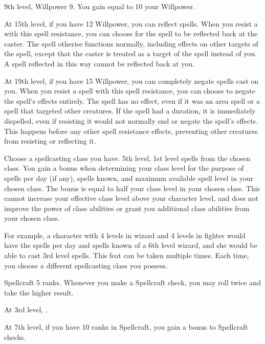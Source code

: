     \featpres 9th level, Willpower 9.
    \featben You gain  equal to 10 \add your Willpower.

    At 15th level, if you have 12 Willpower, you can reflect spells.
    When you resist a  with this spell resistance, you can choose for the spell to be reflected back at the caster.
    The spell otherise functions normally, including effects on other targets of the spell, except that the caster is treated as a target of the spell instead of you.
    A spell reflected in this way cannot be reflected back at you.

    At 19th level, if you have 15 Willpower, you can completely negate spells cast on you.
    When you resist a spell with this spell resistance, you can choose to negate the spell's effects entirely.
    The spell has no effect, even if it was an area spell or a spell that targeted other creatures.
    If the spell had a duration, it is immediately dispelled, even if resisting it would not normally end or negate the spell's effects.
    This happens before any other spell resistance effects, preventing other creatures from resisting or reflecting it.

    Choose a spellcasting class you have.
    \featpres 5th level, 1st level spells from the chosen class.
    \featben You gain a bonus when determining your class level for the purpose of spells per day (if any), spells known, and maximum available spell level in your chosen class.
    The bonus is equal to half your class level in your chosen class.
    This cannot increase your effective class level above your character level, and does not improve the power of class abilities or grant you additional class abilities from your chosen class.

    For example, a character with 4 levels in wizard and 4 levels in fighter would have the spells per day and spells known of a 6th level wizard, and she would be able to cast 3rd level spells.
     This feat can be taken multiple times.
    Each time, you choose a different spellcasting class you possess.

    \featpre Spellcraft 5 ranks.
    \featben Whenever you make a Spellcraft check, you may roll twice and take the higher result.

    At 3rd level, \tdash.

    At 7th level, if you have 10 ranks in Spellcraft, you gain a  bonus to Spellcraft checks.

